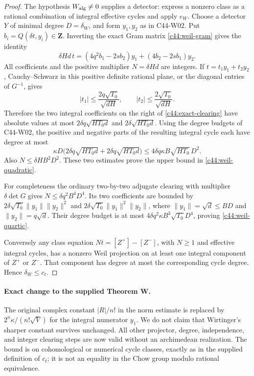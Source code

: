 \documentclass[11pt]{article}
\theoremstyle{remark}\newtheorem{remark}[theorem]{Remark}
\begin{document}
\begin{proof}
The hypothesis $W_{\rm alg}\ne0$ supplies a detector: express a
nonzero class as a rational combination of integral effective
cycles and apply $e_W$.  Choose a detector $Y$ of minimal degree
$D=\delta_W$, and form $y_1,y_2$ as in C44-W02.  Put
$b_i=Q(\delta t,y_i)\in\mathbf Z$.  Inverting the exact Gram matrix
\eqref{c44:weil-gram} gives the identity
\begin{equation}\label{c44:exact-clearing}
 \delta Hd\,t=(4q^2b_1-2sb_2)y_1+(4b_2-2sb_1)y_2.
\end{equation}
All coefficients and the positive multiplier $N=\delta Hd$ are
integers.  If $t=t_1y_1+t_2y_2$, Cauchy--Schwarz in this
positive definite rational plane, or the diagonal entries of
$G^{-1}$, gives
\[
 |t_1|\leq\frac{2q\sqrt{T_0}}{\sqrt{dH}},\qquad
 |t_2|\leq\frac{2\sqrt{T_0}}{\sqrt{dH}}.
\]
Therefore the two integral coefficients on the right of
\eqref{c44:exact-clearing} have absolute values at most
$2\delta q\sqrt{HT_0d}$ and $2\delta\sqrt{HT_0d}$.
Using the degree budgets of C44-W02, the positive and negative
parts of the resulting integral cycle each have degree at most
\[
 \kappa D\bigl(2\delta q\sqrt{HT_0d}
                     +2\delta q\sqrt{HT_0d}\bigr)
 \leq4\delta q\kappa B\sqrt{HT_0}\,D^2.
\]
Also $N\leq\delta HB^2D^2$.  These two estimates prove the
upper bound in \eqref{c44:weil-quadratic}.

For completeness the ordinary two-by-two adjugate clearing with
multiplier $\delta\det G$ gives
$N\leq\delta q^2B^4D^4$.  Its two coefficients are bounded by
$2\delta\sqrt{T_0}\|y_1\|\|y_2\|^2$ and
$2\delta\sqrt{T_0}\|y_1\|^2\|y_2\|$, where
$\|y_1\|=\sqrt d\leq BD$ and $\|y_2\|=q\sqrt d$.
Their degree budget is at most
$4\delta q^2\kappa B^3\sqrt{T_0}D^4$, proving
\eqref{c44:weil-quartic}.

Conversely any class equation
$Nt=[Z^+]-[Z^-]$, with $N\geq1$ and effective integral cycles,
has a nonzero Weil projection on at least one integral component
of $Z^+$ or $Z^-$.  That component has degree at most the
corresponding cycle degree.  Hence $\delta_W\leq c_t$.
\end{proof}

\paragraph{Exact change to the supplied Theorem W.}
The original complex constant $|R|/n!$ in the norm estimate is
replaced by $2^n\kappa/(n!\sqrt V)$ for the integral numerator
$y_1$.  We do not claim that Wirtinger's sharper constant survives
unchanged.  All other projector, degree, independence, and integer
clearing steps are now valid without an archimedean realization.
The bound is on cohomological or numerical cycle classes, exactly
as in the supplied definition of $c_t$; it is not an equality in
the Chow group modulo rational equivalence.
\end{document}

